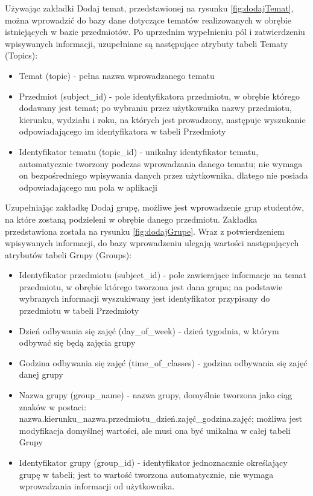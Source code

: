 Używając zakładki Dodaj temat, przedstawionej na rysunku \ref{fig:dodajTemat}, można wprowadzić do bazy dane dotyczące tematów realizowanych w obrębie istniejących w bazie przedmiotów. Po uprzednim wypełnieniu pól i zatwierdzeniu wpisywanych informacji, uzupełniane są następujące atrybuty tabeli Tematy (Topics):
\begin{itemize}
\item Temat (topic) - pełna nazwa wprowadzanego tematu
\item Przedmiot (subject\_id) - pole identyfikatora przedmiotu, w obrębie którego dodawany jest temat; po wybraniu przez użytkownika nazwy przedmiotu, kierunku, wydziału i roku, na których jest prowadzony, następuje wyszukanie odpowiadającego im identyfikatora w tabeli Przedmioty
\item Identyfikator tematu (topic\_id) - unikalny identyfikator tematu, automatycznie tworzony podczas wprowadzania danego tematu; nie wymaga on bezpośredniego wpisywania danych przez użytkownika, dlatego nie posiada odpowiadającego mu pola w aplikacji
\end{itemize}

Uzupełniając zakładkę Dodaj grupę, możliwe jest wprowadzenie grup studentów, na które zostaną podzieleni w obrębie danego przedmiotu. Zakładka przedstawiona została na rysunku \ref{fig:dodajGrupe}. Wraz z potwierdzeniem wpisywanych informacji, do bazy wprowadzeniu ulegają wartości następujących atrybutów tabeli Grupy (Groups):
\begin{itemize}
\item Identyfikator przedmiotu (subject\_id) - pole zawierające informacje na temat przedmiotu, w obrębie którego tworzona jest dana grupa; na podstawie wybranych informacji wyszukiwany jest identyfikator przypisany do przedmiotu w tabeli Przedmioty
\item Dzień odbywania się zajęć (day\_of\_week) - dzień tygodnia, w którym odbywać się będą zajęcia grupy
\item Godzina odbywania się zajęć (time\_of\_classes) - godzina odbywania się zajęć danej grupy
\item Nazwa grupy (group\_name) - nazwa grupy, domyślnie tworzona jako ciąg znaków w postaci: nazwa.kierunku\_nazwa.przedmiotu\_dzień.zajęć\_godzina.zajęć; możliwa jest modyfikacja domyślnej wartości, ale musi ona być unikalna w całej tabeli Grupy
\item Identyfikator grupy (group\_id) - identyfikator jednoznacznie określający grupę w tabeli; jest to wartość tworzona automatycznie, nie wymaga wprowadzania informacji od użytkownika.
\end{itemize}

